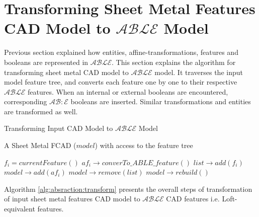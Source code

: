\section{Transforming Sheet Metal Features CAD Model to $\mathcal{ABLE}$ Model}


Previous section explained how entities, affine-transformations, features and booleans are represented in $\mathcal{ABLE}$. This section explains the algorithm for transforming sheet metal CAD model to $\mathcal{ABLE}$ model. It traverses the input model feature tree, and converts each feature one by one to their respective $\mathcal{ABLE}$ features. When an internal or external booleans are encountered, corresponding $\mathcal{AB:E}$ booleans are inserted. Similar transformations and entities are transformed as well. 

\bigskip

\begin{algorithm}[H]
	\caption{Transforming Input CAD Model to $\mathcal{ABLE}$ Model }
	\label{alg:absraction:transform}
	\begin{algorithmic}[1]
		\REQUIRE A Sheet Metal FCAD ($model$) with access to the feature tree
		
			\STATE $f_i = currentFeature()$
			\STATE $af_i \rightarrow converTo\_ABLE\_feature()$
			\STATE $list \rightarrow add(f_i)$
			\STATE $model \rightarrow  add(af_i)$
			\ENDWHILE
		\STATE  $model \rightarrow remove(list)$
		\STATE  $model \rightarrow rebuild()$
	\end{algorithmic}
\end{algorithm}


Algorithm \ref{alg:absraction:transform} presents the overall steps of transformation of input sheet metal features CAD model to $\mathcal{ABLE}$ CAD features i.e. Loft-equivalent features.





